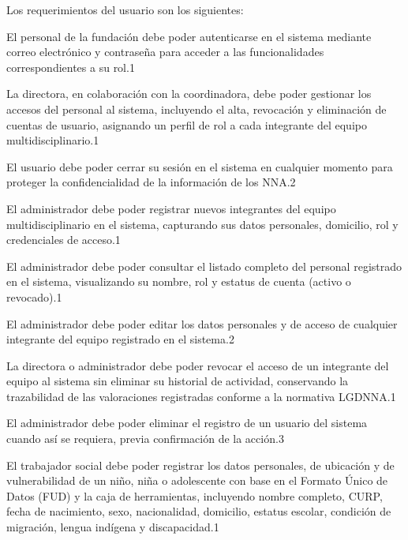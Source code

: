 Los requerimientos del usuario son los siguientes\FootnoteStatus:
\begin{requerimientosU}
	
	{El personal de la fundación debe poder autenticarse en el sistema 
		mediante correo electrónico y contraseña para acceder a las 
		funcionalidades correspondientes a su rol.}{1}{\DONE}
	
	{La directora, en colaboración con la coordinadora, debe poder 
		gestionar los accesos del personal al sistema, incluyendo el alta, 
		revocación y eliminación de cuentas de usuario, asignando un perfil 
		de rol a cada integrante del equipo multidisciplinario.}{1}{\DONE}
	
	{El usuario debe poder cerrar su sesión en el sistema en cualquier 
		momento para proteger la confidencialidad de la información de los 
		NNA.}{2}{\DONE}
	
	{El administrador debe poder registrar nuevos integrantes del equipo 
		multidisciplinario en el sistema, capturando sus datos personales, 
		domicilio, rol y credenciales de acceso.}{1}{\DONE}
	
	{El administrador debe poder consultar el listado completo del 
		personal registrado en el sistema, visualizando su nombre, rol y 
		estatus de cuenta (activo o revocado).}{1}{\DONE}
	
	{El administrador debe poder editar los datos personales y de acceso 
		de cualquier integrante del equipo registrado en el sistema.}{2}{\DONE}
	
	{La directora o administrador debe poder revocar el acceso de un 
		integrante del equipo al sistema sin eliminar su historial de 
		actividad, conservando la trazabilidad de las valoraciones 
		registradas conforme a la normativa LGDNNA.}{1}{\DONE}
	
	{El administrador debe poder eliminar el registro de un usuario del 
		sistema cuando así se requiera, previa confirmación de la 
		acción.}{3}{\DONE}
	
	{El trabajador social debe poder registrar los datos personales, de 
		ubicación y de vulnerabilidad de un niño, niña o adolescente con 
		base en el Formato Único de Datos (FUD) y la caja de herramientas, 
		incluyendo nombre completo, CURP, fecha de nacimiento, sexo, 
		nacionalidad, domicilio, estatus escolar, condición de migración, 
		lengua indígena y discapacidad.}{1}{\DONE}
	

\end{requerimientosU}
